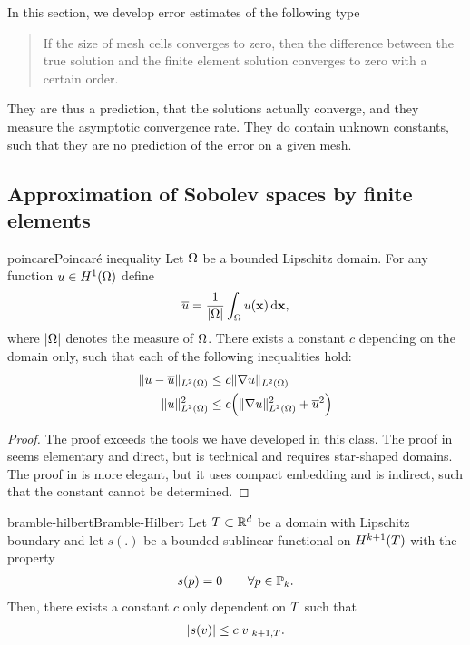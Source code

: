 \begin{intro}
  In this section, we develop error estimates of the following type
  \begin{verse}
    If the size of mesh cells converges to zero, then the difference
    between the true solution and the finite element solution
    converges to zero with a certain order.
  \end{verse}
  They are thus a prediction, that the solutions actually converge,
  and they measure the asymptotic convergence rate. They do contain unknown constants, such that they are no prediction of the error on a given mesh.
\end{intro}

\subsection{Approximation of Sobolev spaces by finite elements}

\begin{Lemma*}{poincare}{Poincaré inequality}
  Let $\domain$ be a bounded Lipschitz domain. For any function
  $u\in H^1(\domain)$ define
  \begin{gather}
    \overline u = \frac1{\abs{\domain}} \int_\domain u(\vx) \dvx,
  \end{gather}
  where $\abs{\domain}$ denotes the measure of $\domain$. There exists
  a constant $c$ depending on the domain only, such that each of the
  following inequalities hold:
  \begin{align}
    \norm{u-\overline u}_{L^2(\domain)} &\le c \norm{\nabla u}_{L^2(\domain)}\\
    \norm{u}_{L^2(\domain)}^2 &\le c \Bigl(\norm{\nabla u}_{L^2(\domain)}^2 + \overline u^2\Bigr)
  \end{align}
\end{Lemma*}

\begin{proof}
  The proof exceeds the tools we have developed in this class. The
  proof in \cite[Section 7.8]{GilbargTrudinger98} seems elementary and
  direct, but is technical and requires star-shaped domains. The proof
  in \cite[Section 5.8.1]{Evans98} is more elegant, but it uses
  compact embedding and is indirect, such that the constant cannot be
  determined.
\end{proof}

\begin{Lemma*}{bramble-hilbert}{Bramble-Hilbert}
  Let $\cell\subset \R^d$ be a domain with Lipschitz boundary and let
  $s(.)$ be a bounded sublinear functional on $H^{k+1}(\cell)$ with
  the property
  \begin{gather}
    s(p) = 0 \qquad\forall p\in \P_k.
  \end{gather}
  Then, there exists a constant $c$ only dependent on $\cell$ such that
  \begin{gather}
    \abs{s(v)} \le c \snorm{v}_{k+1,\cell}.
  \end{gather}
\end{Lemma*}

